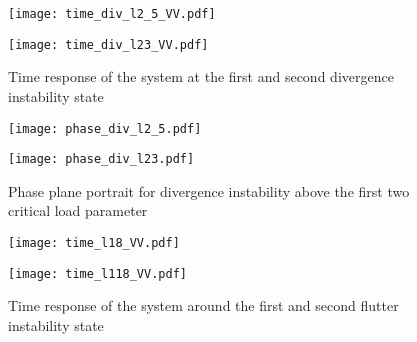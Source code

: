 \documentclass[12pt]{article}
\begin{document}
\begin{figure}[H]
	\centering
	\begin{minipage}[b]{0.47\textwidth}
	\centering
	\texttt{[image: time\_div\_l2\_5\_VV.pdf]}
	\label{fig:root_amp}
	\end{minipage}\hfill
	\begin{minipage}[b]{0.47\textwidth}
	\centering
	\texttt{[image: time\_div\_l23\_VV.pdf]}
	\label{fig:root_amp_div}
	\end{minipage}
	\caption{Time response of the system at the first and second divergence instability state}
	\label{fig:div1_2}
\end{figure}

\begin{figure}[H]
	\centering
	\begin{minipage}[b]{0.47\textwidth}
	\centering
	\texttt{[image: phase\_div\_l2\_5.pdf]}
	\label{fig:root_amp}
	\end{minipage}\hfill
	\begin{minipage}[b]{0.47\textwidth}
	\centering
	\texttt{[image: phase\_div\_l23.pdf]}
	\label{fig:root_amp_div}
	\end{minipage}
	\caption{Phase plane portrait for divergence instability above the first two critical load parameter}
	\label{fig:div1_2_2}
\end{figure}

\begin{figure}[htbp]
	\centering
	\begin{minipage}[b]{0.47\textwidth}
	\centering
	\texttt{[image: time\_l18\_VV.pdf]}
	\label{fig:root_amp}
	\end{minipage}\hfill
	\begin{minipage}[b]{0.47\textwidth}
	\centering
	\texttt{[image: time\_l118\_VV.pdf]}
	\label{fig:root_amp_flutter}
	\end{minipage}
	\caption{Time response of the system around the first and second flutter instability state}
	\label{fig:flutter1_2}
\end{figure}
\end{document}
